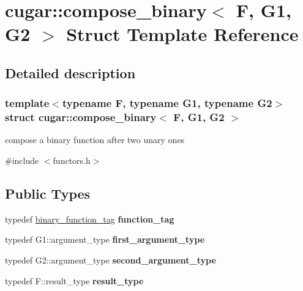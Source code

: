 \hypertarget{structcugar_1_1compose__binary}{}\section{cugar\+:\+:compose\+\_\+binary$<$ F, G1, G2 $>$ Struct Template Reference}
\label{structcugar_1_1compose__binary}


\subsection{Detailed description}
\subsubsection*{template$<$typename F, typename G1, typename G2$>$\newline
struct cugar\+::compose\+\_\+binary$<$ F, G1, G2 $>$}

compose a binary function after two unary ones 

{\ttfamily \#include $<$functors.\+h$>$}

\subsection*{Public Types}
\begin{DoxyCompactItemize}
\item 
\mbox{\label{structcugar_1_1compose__binary_a952674add18272aa843b649c2eaf673f}} 
typedef \hyperlink{structcugar_1_1binary__function__tag}{binary\+\_\+function\+\_\+tag} {\bfseries function\+\_\+tag}
\item 
\mbox{\label{structcugar_1_1compose__binary_ae13750e2e9d55157716d02d7cf6a0772}} 
typedef G1\+::argument\+\_\+type {\bfseries first\+\_\+argument\+\_\+type}
\item 
\mbox{\label{structcugar_1_1compose__binary_a63cd0573a047ba9ccb92494f3e69d56c}} 
typedef G2\+::argument\+\_\+type {\bfseries second\+\_\+argument\+\_\+type}
\item 
\mbox{\label{structcugar_1_1compose__binary_a12735065900fa746b5cdbaa639a305bf}} 
typedef F\+::result\+\_\+type {\bfseries result\+\_\+type}
\end{DoxyCompactItemize}
